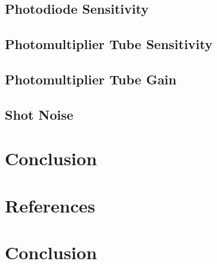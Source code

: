 \documentclass[10pt]{article}
\begin{document}
\subsection{Photodiode Sensitivity}
\subsection{Photomultiplier Tube Sensitivity}
\subsection{Photomultiplier Tube Gain}
\subsection{Shot Noise}
\section {Conclusion}


\section {References}










\section{Conclusion}
\end{document}

